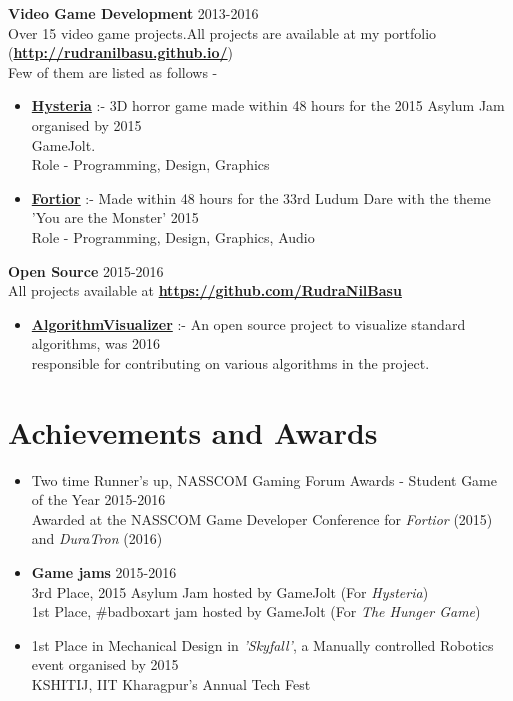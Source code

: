 \documentclass[margin, centered]{res}
\begin{document}
\begin{resume}

\textbf{Video Game Development} \hfill 2013-2016\\
Over 15 video game projects.All projects are available at my portfolio (\href{http://rudranilbasu.github.io/}{\textbf{http://rudranilbasu.github.io/}})\\
Few of them are listed as follows - 

\begin{itemize}[leftmargin=*]
	\item \textbf{\href{http://gamejolt.com/games/hysteria/107191}{Hysteria}} :- 3D horror game made within 48 hours for the 2015 Asylum Jam organised by \hfill 2015 \\GameJolt. \\Role - Programming, Design, Graphics
	\item \textbf{\href{http://gamejolt.com/games/fortior/88093}{Fortior}} :- Made within 48 hours for the 33rd Ludum Dare with the theme 'You are the Monster' \hfill 2015
	\\Role - Programming, Design, Graphics, Audio
\end{itemize}


\textbf{Open Source} \hfill 2015-2016\\
All projects available at \textbf{\href{https://github.com/RudraNilBasu}{https://github.com/RudraNilBasu}}
\begin{itemize}[leftmargin=*]
	\item \textbf{\href{https://github.com/parkjs814/AlgorithmVisualizer}{AlgorithmVisualizer}} :- An open source project to visualize standard algorithms, was \hfill 2016 \\
responsible for contributing on various algorithms in the project.

	
\end{itemize}

\section{Achievements and Awards}
\begin{itemize}[leftmargin=*]
\item Two time Runner's up, NASSCOM Gaming Forum Awards - Student Game of the Year \hfill 2015-2016\\  
Awarded at the NASSCOM Game Developer Conference for \textit{Fortior} (2015) and \textit{DuraTron} (2016)
\item \textbf{Game jams} \hfill 2015-2016
\\
3rd Place, 2015 Asylum Jam hosted by GameJolt (For \textit{Hysteria})\\
1st Place, \#badboxart jam hosted by GameJolt (For \textit{The Hunger Game})
\item 1st Place in Mechanical Design in \textit{'Skyfall'}, a Manually controlled Robotics event organised by \hfill2015 \\ KSHITIJ, IIT Kharagpur's Annual Tech Fest
\end{itemize}


\end{resume}
\end{document}
